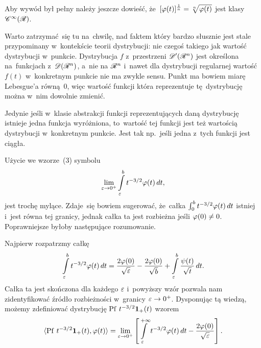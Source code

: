 \documentclass[a4paper,11pt]{article}
\begin{document}
\vspace{\spaceFour}


\start {} Aby wywód był pełny należy jeszcze dowieść,
że~$[ \varphi( t ) ]^{ \frac{ 1 }{ n } } = \sqrt[ n ]{ \varphi( t ) }$ jest
klasy $\mathcal{C}^{ \infty }( \mathcal{R} )$.

\vspace{\spaceFour}


\start {} Warto zatrzymać~się tu na~chwilę, nad faktem który
bardzo słusznie jest stale przypominany w~kontekście teorii
dystrybucji: nie czegoś takiego jak wartość dystrybucji w~punkcie.
Dystrybucja $f$ z~przestrzeni $\mathcal{D}'( \mathcal{R}^{ n } )$ jest określona
na~funkcjach z~$\mathcal{D}( \mathcal{R}^{ n } )$, a~nie na $\mathcal{R}^{ n }$ i~nawet dla dystrybucji
regularnej wartość $f( t )$ w~konkretnym punkcie nie ma zwykle sensu.
Punkt ma bowiem miarę Lebesgue'a równą~0, więc wartość funkcji która
reprezentuje tę~dystrybucję można w~nim dowolnie zmienić.

Jedynie jeśli w~klasie abstrakcji funkcji reprezentujących daną
dystrybucję istnieje jedna funkcja wyróżniona, to~wartość tej funkcji
jest też wartością dystrybucji w~konkretnym punkcie. Jest tak
np.~jeśli jedna z~tych funkcji jest ciągła.

\vspace{\spaceFour}


\start {} Użycie we wzorze~(3) symbolu
\begin{equation}
  \label{eq:Zem-s01-01}
  \lim\limits_{ \varepsilon \to 0^{ + } } \int\limits_{ \varepsilon }^{ b } t^{ -3/2 } \varphi( t ) \, dt,
\end{equation}
jest trochę mylące. Zdaje~się bowiem sugerować, że~całka
$\int_{ 0 }^{ b } t^{ -3/2 } \varphi( t ) \, dt$ istniej i~jest równa tej
granicy, jednak całka ta jest rozbieżna jeśli $\varphi( 0 ) \neq 0$.
Poprawniejsze byłoby następujące rozumowanie.

Najpierw rozpatrzmy całkę
\begin{equation}
  \label{eq:Zem-s01-02}
  \int\limits_{ \varepsilon }^{ b } t^{ -3/2 } \varphi( t ) \, dt
  = \frac{ 2 \varphi( 0 ) }{ \sqrt{ \varepsilon } } - \frac{ 2 \varphi( 0 ) }{ \sqrt{ b } }
  + \int\limits_{ \varepsilon }^{ b } \frac{ \psi( t ) }{ \sqrt{ t } } \, dt.
\end{equation}
Całka ta jest skończona dla każdego $\varepsilon$ i~powyższy wzór pozwala
nam zidentyfikować źródło rozbieżności w~granicy $\varepsilon \to 0^{ + }$.
Dysponując tą wiedzą, możemy zdefiniować dystrybucję
$\mathrm{Pf}\, \, t^{ -3/2 } \mathbf{1}_{ + }( t )$ wzorem
\begin{equation}
  \label{eq:Zem-s01-03}
  \langle \mathrm{Pf}\, \, t^{ -3/2 } \mathbf{1}_{ + }( t ), \varphi( t ) \rangle = \lim\limits_{ \varepsilon \to 0^{ + } }
  \left[ \int\limits_{ \varepsilon }^{ +\infty } t^{ -3/2 } \varphi( t ) \, dt
    - \frac{ 2 \varphi( 0 ) }{ \sqrt{ \varepsilon } } \right].
\end{equation}
\end{document}
